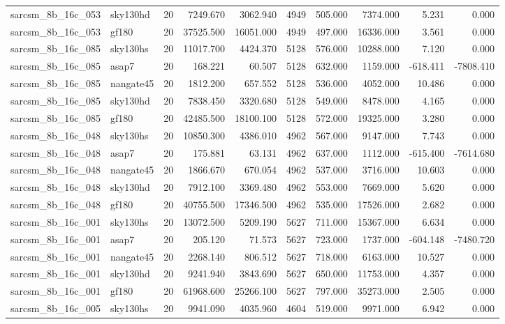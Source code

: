 \begin{longtable}{llrrrrrrrr}
sarcsm\_8b\_16c\_053 & sky130hd & 20 & 7249.670 & 3062.940 & 4949 & 505.000 & 7374.000 & 5.231 & 0.000 \\
sarcsm\_8b\_16c\_053 & gf180 & 20 & 37525.500 & 16051.000 & 4949 & 497.000 & 16336.000 & 3.561 & 0.000 \\
sarcsm\_8b\_16c\_085 & sky130hs & 20 & 11017.700 & 4424.370 & 5128 & 576.000 & 10288.000 & 7.120 & 0.000 \\
sarcsm\_8b\_16c\_085 & asap7 & 20 & 168.221 & 60.507 & 5128 & 632.000 & 1159.000 & -618.411 & -7808.410 \\
sarcsm\_8b\_16c\_085 & nangate45 & 20 & 1812.200 & 657.552 & 5128 & 536.000 & 4052.000 & 10.486 & 0.000 \\
sarcsm\_8b\_16c\_085 & sky130hd & 20 & 7838.450 & 3320.680 & 5128 & 549.000 & 8478.000 & 4.165 & 0.000 \\
sarcsm\_8b\_16c\_085 & gf180 & 20 & 42485.500 & 18100.100 & 5128 & 572.000 & 19325.000 & 3.280 & 0.000 \\
sarcsm\_8b\_16c\_048 & sky130hs & 20 & 10850.300 & 4386.010 & 4962 & 567.000 & 9147.000 & 7.743 & 0.000 \\
sarcsm\_8b\_16c\_048 & asap7 & 20 & 175.881 & 63.131 & 4962 & 637.000 & 1112.000 & -615.400 & -7614.680 \\
sarcsm\_8b\_16c\_048 & nangate45 & 20 & 1866.670 & 670.054 & 4962 & 537.000 & 3716.000 & 10.603 & 0.000 \\
sarcsm\_8b\_16c\_048 & sky130hd & 20 & 7912.100 & 3369.480 & 4962 & 553.000 & 7669.000 & 5.620 & 0.000 \\
sarcsm\_8b\_16c\_048 & gf180 & 20 & 40755.500 & 17346.500 & 4962 & 535.000 & 17526.000 & 2.682 & 0.000 \\
sarcsm\_8b\_16c\_001 & sky130hs & 20 & 13072.500 & 5209.190 & 5627 & 711.000 & 15367.000 & 6.634 & 0.000 \\
sarcsm\_8b\_16c\_001 & asap7 & 20 & 205.120 & 71.573 & 5627 & 723.000 & 1737.000 & -604.148 & -7480.720 \\
sarcsm\_8b\_16c\_001 & nangate45 & 20 & 2268.140 & 806.512 & 5627 & 718.000 & 6163.000 & 10.527 & 0.000 \\
sarcsm\_8b\_16c\_001 & sky130hd & 20 & 9241.940 & 3843.690 & 5627 & 650.000 & 11753.000 & 4.357 & 0.000 \\
sarcsm\_8b\_16c\_001 & gf180 & 20 & 61968.600 & 25266.100 & 5627 & 797.000 & 35273.000 & 2.505 & 0.000 \\
sarcsm\_8b\_16c\_005 & sky130hs & 20 & 9941.090 & 4035.960 & 4604 & 519.000 & 9971.000 & 6.942 & 0.000 \\

\end{longtable}
